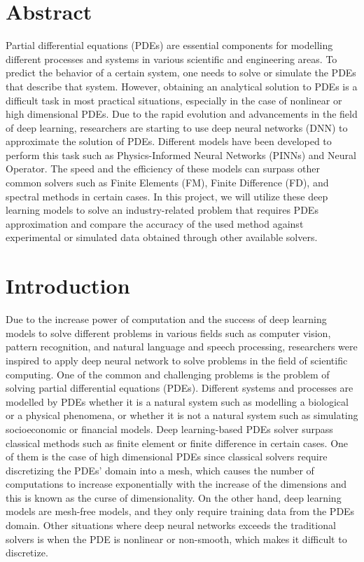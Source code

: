 \documentclass[a4paper,12pt]{article}
\theoremstyle{definition}
\begin{document}

\onehalfspacing %
\section*{Abstract}
Partial differential equations (PDEs) are essential components for modelling different processes 
and systems in various scientific and engineering areas. To predict the behavior of a certain system, 
one needs to solve or simulate the PDEs that describe that system. However, 
obtaining an analytical solution to PDEs is a difficult task in most practical situations, 
especially in the case of nonlinear or high dimensional PDEs. 
Due to the rapid evolution and advancements in the field of deep learning, 
researchers are starting to use deep neural networks (DNN) to approximate the solution of PDEs. 
Different models have been developed to perform this task such as Physics-Informed Neural Networks (PINNs) 
and Neural Operator. The speed and the efficiency of these models can surpass other common solvers 
such as Finite Elements (FM), Finite Difference (FD), and spectral methods in certain cases. 
In this project, we will utilize these deep learning models to solve an industry-related problem that 
requires PDEs approximation and compare the accuracy of the used method against 
experimental or simulated data obtained through other available solvers.

\section{Introduction}
Due to the increase power of computation and the success of deep learning models to 
solve different problems in various fields such
as computer vision\cite{chai2021deep}, pattern recognition\cite{serey2023pattern}, 
and natural language and speech processing\cite{NLPChai}, 
researchers were inspired to apply deep neural network to solve problems in the field of scientific computing. 
One of the common and challenging problems is the problem of solving partial differential equations (PDEs).
Different systems and processes are modelled by PDEs whether it is a natural system such as 
modelling a biological or a physical phenomena\cite{grossmann2023can,beck2020overview}, or whether it is not a natural system such as
simulating socioeconomic or financial models\cite{beck2020overview}. Deep learning-based PDEs solver surpass classical methods such as 
finite element or finite difference in certain cases\cite{grossmann2023can}. 
One of them is the case of high dimensional PDEs since classical solvers require discretizing the PDEs' domain into a mesh, 
which causes the number of computations to increase exponentially with the increase of the dimensions and this is known as the curse of dimensionality. 
On the other hand, deep learning models are mesh-free models, and they only require training data from the PDEs domain. 
Other situations where deep neural networks exceeds the traditional solvers is when the PDE is 
nonlinear or non-smooth, which makes it difficult to discretize\cite{grossmann2023can}. 
\end{document}
